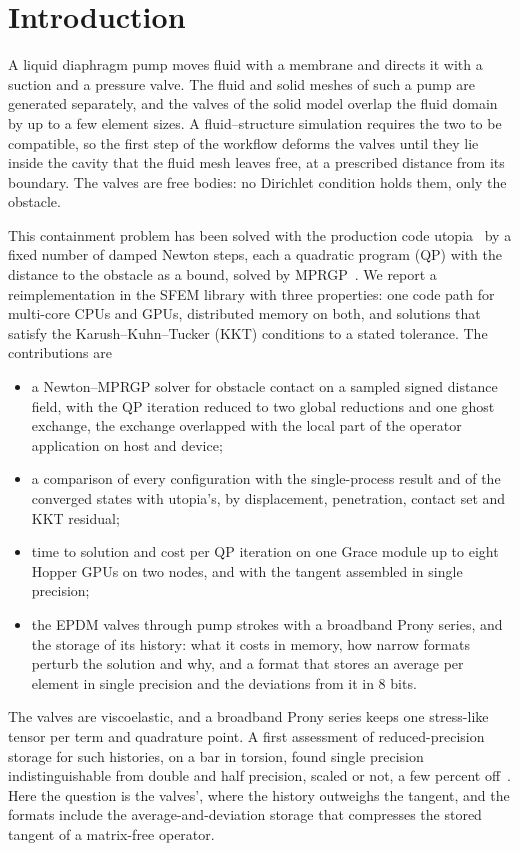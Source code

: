 \documentclass[sigconf,nonacm]{acmart}
\begin{document}
\section{Introduction}

A liquid diaphragm pump moves fluid with a membrane and directs it with a suction and a pressure
valve. The fluid and solid meshes of such a pump are generated separately, and the valves of the
solid model overlap the fluid domain by up to a few element sizes. A fluid--structure simulation
requires the two to be compatible, so the first step of the workflow deforms the valves until
they lie inside the cavity that the fluid mesh leaves free, at a prescribed distance from its
boundary. The valves are free bodies: no Dirichlet condition holds them, only the obstacle.

This containment problem has been solved with the production code utopia~\cite{zulian2021utopia}
by a fixed number of damped Newton steps, each a quadratic program (QP) with the distance to the
obstacle as a bound, solved by MPRGP~\cite{dostal2005mprgp}. We report a reimplementation in the
SFEM library with three properties: one code path for multi-core CPUs and GPUs, distributed memory
on both, and solutions that satisfy the Karush--Kuhn--Tucker (KKT) conditions to a stated
tolerance. The contributions are
\begin{itemize}
\item a Newton--MPRGP solver for obstacle contact on a sampled signed distance field, with the
  QP iteration reduced to two global reductions and one ghost exchange, the exchange overlapped
  with the local part of the operator application on host and device;
\item a comparison of every configuration with the single-process result and of the converged
  states with utopia's, by displacement, penetration, contact set and KKT residual;
\item time to solution and cost per QP iteration on one Grace module up to eight Hopper GPUs on
  two nodes, and with the tangent assembled in single precision;
\item the EPDM valves through pump strokes with a broadband Prony series, and the storage of its
  history: what it costs in memory, how narrow formats perturb the solution and why, and a format
  that stores an average per element in single precision and the deviations from it in 8 bits.
\end{itemize}

The valves are viscoelastic, and a broadband Prony series keeps one stress-like tensor per term
and quadrature point. A first assessment of reduced-precision storage for such histories, on a
bar in torsion, found single precision indistinguishable from double and half precision, scaled or
not, a few percent off~\cite{yang2026prony}. Here the question is the valves', where the history
outweighs the tangent, and the formats include the average-and-deviation storage that compresses
the stored tangent of a matrix-free operator.
\end{document}

